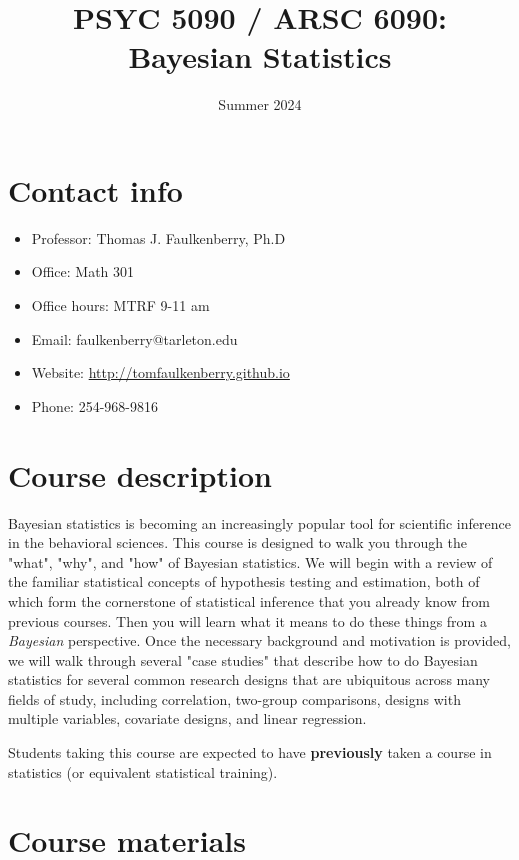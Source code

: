 \documentclass[10pt]{article}
\date{Summer 2024}
\title{PSYC 5090 / ARSC 6090: Bayesian Statistics}
\begin{document}
\maketitle

\section*{Contact info}
\label{sec:orgb6420d6}
\begin{itemize}
\item Professor: Thomas J. Faulkenberry, Ph.D
\item Office: Math 301
\item Office hours: MTRF 9-11 am
\item Email: faulkenberry@tarleton.edu
\item Website: \url{http://tomfaulkenberry.github.io}
\item Phone: 254-968-9816
\end{itemize}

\section*{Course description}
\label{sec:org85f6a9b}

Bayesian statistics is becoming an increasingly popular tool for scientific inference in the behavioral sciences. This course is designed to walk you through the "what", "why", and "how" of Bayesian statistics. We will begin with a review of the familiar statistical concepts of hypothesis testing and estimation, both of which form the cornerstone of statistical inference that you already know from previous courses. Then you will learn what it means to do these things from a \emph{Bayesian} perspective. Once the necessary background and motivation is provided, we will walk through several "case studies" that describe how to do Bayesian statistics for several common research designs that are ubiquitous across many fields of study, including correlation, two-group comparisons, designs with multiple variables, covariate designs, and linear regression.  

Students taking this course are expected to have \textbf{previously} taken a course in statistics (or equivalent statistical training). 

\section*{Course materials}
\label{sec:org7bbb969}
\end{document}
